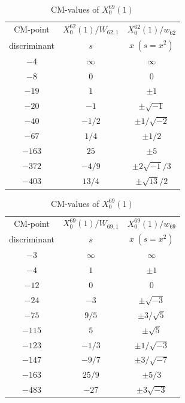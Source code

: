 \documentclass{amsart}
\theoremstyle{definition}
\begin{document}
\begin{appendices}
\begin{table}
\end{table}

\renewcommand{\arraystretch}{1.5}
\tabcolsep=10pt                         
\begin{table}
\renewcommand{\arraystretch}{1.5}
\tabcolsep=10pt                         
\begin{tabular}{|c|c|c|}
\hline
CM-point& ${X_{0}^{62}(1)/W_{62,1}}$ & ${X_{0}^{62}(1)/w_{62}}$  \\ 
       discriminant   & $s$ & $x\ (s=x^2)$   \\ \hline
${-4}$ & $\infty$ & $\infty$  \\ 
${-8}$ & $0$ & $0$  \\ 
${-19}$ & $1$ & $\pm 1$  \\
${-20}$ & $-1$ & $\pm \sqrt{-1}$  \\ 
${-40}$ & $-{1}/{2}$ & $\pm 1/\sqrt{-2}$  \\ 
${-67}$ & ${1}/{4}$ & $\pm {1}/{2}$  \\ 
${-163}$ & $25$ & $\pm 5$   \\
${-372}$ & $-{4}/{9}$ & $\pm {2\sqrt{-1}}/{3}$  \\ 
${-403}$ & ${13}/{4}$ & $ \pm{\sqrt{13}}/{2}$  \\ \hline
\end{tabular}
\bigskip
\caption{CM-values of $X^{62}_0(1)$}

\renewcommand{\arraystretch}{1.5}
\tabcolsep=10pt                         

\begin{tabular}{|c|c|c|}
\hline
CM-point& ${X_{0}^{69}(1)/W_{69,1}}$ & ${X_{0}^{69}(1)/w_{69}}$ \\ 
        discriminant  & $s$ & $x\ (s=x^2)$   \\ \hline
${-3}$ & $\infty$ & $\infty$  \\ 
${-4}$ & $1$ & $\pm1$ \\ 

${-12}$ & $0$ & $0$  \\
${-24}$ & $-3$ & $ \pm\sqrt{-3}$  \\ 
${-75}$ & ${9}/{5}$ & $\pm{3/\sqrt{5}}$ \\ 
${-115}$ & $5$ & $\pm\sqrt{5}$ \\ 
${-123}$ & $-{1}/{3}$ & $\pm 1/\sqrt{-3}$ \\ 
${-147}$ & $-{9}/{7}$ & $\pm{3}/{\sqrt{-7}}$   \\ 
${-163}$ & ${25}/{9}$ & $\pm{{5}}/{3}$  \\ 
${-483}$ & $-27$ & $\pm3\sqrt{-3}$  \\ \hline
\end{tabular}
\bigskip
\caption{CM-values of $X^{69}_0(1)$}


\end{table}
\end{appendices}
\end{document}
